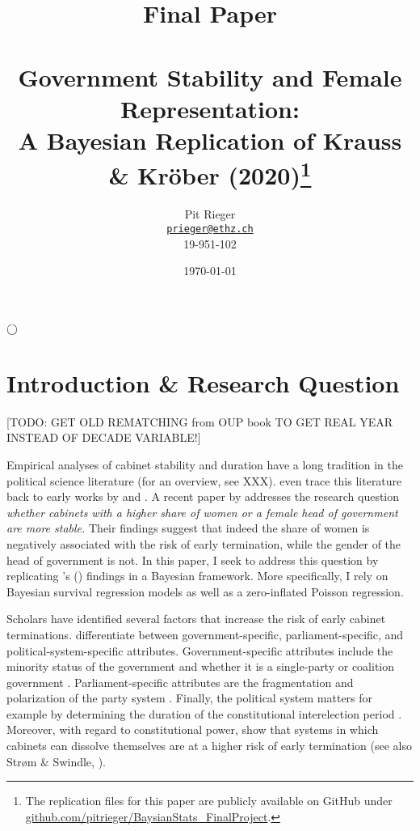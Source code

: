 \documentclass[11pt]{article}
\title{\large Final Paper \\ ~ \\
\LARGE  Government Stability and Female Representation:\\
A Bayesian Replication of Krauss \& Kröber (2020)\footnote[1]{The replication files for this paper are publicly available on GitHub under \url{github.com/pitrieger/BaysianStats_FinalProject}.}}
\author{Pit Rieger\\
    \href{mailto:prieger@ethz.ch}{\texttt{prieger@ethz.ch}}\\
    19-951-102}
\date{\today}
\newcommand\possecite[1]{\citeauthor{#1}'s (\citeyear{#1})}
\begin{document}
\maketitle

\bigskip
\bigskip
\bigskip
\bigskip
\begin{center}
    $\Huge \bigcirc$
\end{center}
\bigskip
\bigskip
\bigskip
\bigskip

\begin{abstract}
{\noindent\itshape
\lipsum[1]
}
\end{abstract}

\bigskip
\bigskip
\bigskip
\bigskip

\newpage


\section{Introduction \& Research Question}

[TODO: GET OLD REMATCHING from OUP book TO GET REAL YEAR INSTEAD OF DECADE VARIABLE!]

Empirical analyses of cabinet stability and duration have a long tradition in the political science literature (for an overview, see XXX). \textcite{LupiaStrøm1995} even trace this literature back to early works by \textcite{Bryce1921} and \textcite{Lowell1896}. A recent paper by \textcite{KK20} addresses the research question \textit{whether cabinets with a higher share of women or a female head of government are more stable.} Their findings suggest that indeed the share of women is negatively associated with the risk of early termination, while the gender of the head of government is not. In this paper, I seek to address this question by replicating \possecite{KK20} findings in a Bayesian framework. More specifically, I rely on Bayesian survival regression models as well as a zero-inflated Poisson regression. 

Scholars have identified several factors that increase the risk of early cabinet terminations. \textcite{SchleiterMorganJones2009} differentiate between government-specific, parliament-specific, and political-system-specific attributes. Government-specific attributes include the minority status of the government and whether it is a single-party or coalition government \parencite{StromSwindle2002}. Parliament-specific attributes are the fragmentation and polarization of the party system \parencite{KingEtAl1990}. Finally, the political system matters for example by determining the duration of the constitutional interelection period \parencite{StromSwindle2002}. Moreover, with regard to constitutional power, \textcite{SchleiterMorganJones2009} show that systems in which cabinets can dissolve themselves are at a higher risk of early termination (see also Strøm \& Swindle, \citeyear{StromSwindle2002}).
\end{document}
